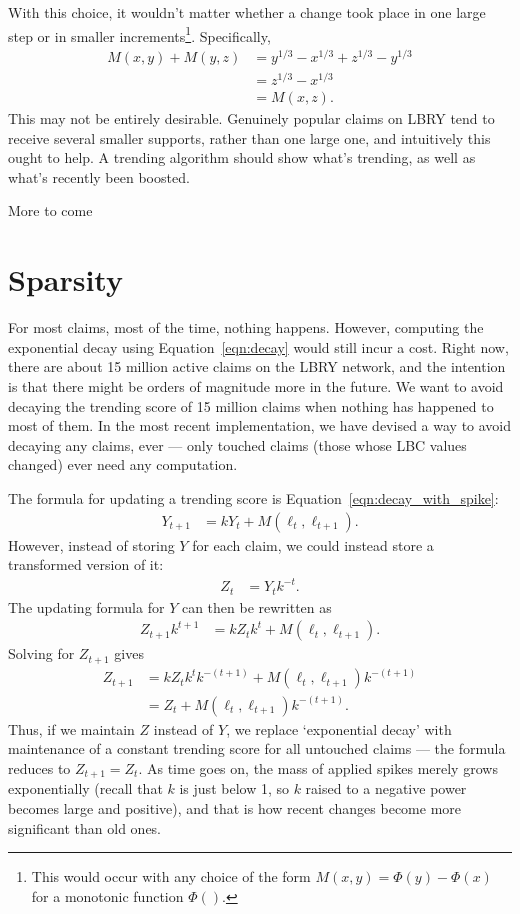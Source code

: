 \documentclass[a4paper, 12pt]{article}
\begin{document}
With this choice, it wouldn't matter whether a change took place in one large
step or in smaller increments\footnote{This would occur with any
choice of the form $M(x, y) = \Phi(y) - \Phi(x)$ for a monotonic function
$\Phi()$.}. Specifically,
\begin{align}
M(x, y) + M(y, z)
    &= y^{1/3} - x^{1/3} + z^{1/3} - y^{1/3} \\
    &= z^{1/3} - x^{1/3} \\
    &= M(x, z).
\end{align}
This may not be entirely desirable. Genuinely popular claims on LBRY tend
to receive several smaller supports, rather than one large one, and intuitively
this ought to help. A trending algorithm should show what's trending,
as well as what's recently been boosted.


More to come



\section{Sparsity}
For most claims, most of the time, nothing happens. However, computing the
exponential decay using Equation~\ref{eqn:decay} would still incur a cost.
Right now, there are about 15 million active claims on the LBRY network,
and the intention is that there might be orders of magnitude more in the
future. We want to avoid decaying the trending score of 15 million claims
when nothing has happened to most of them. In the most recent implementation,
we have devised a way to avoid decaying any claims, ever --- only touched claims
(those whose LBC values changed) ever need any computation.

The formula for updating a trending score is Equation~\ref{eqn:decay_with_spike}:
\begin{align}
Y_{t+1} &= kY_t + M(\ell_t, \ell_{t+1}).
\end{align}
However, instead of storing $Y$ for each claim, we could instead store
a transformed version of it:
\begin{align}
Z_t &= Y_t k^{-t}.
\end{align}
The updating formula for $Y$ can then be rewritten as
\begin{align}
Z_{t+1} k^{t+1} &= kZ_t k^t + M(\ell_t, \ell_{t+1}).
\end{align}
Solving for $Z_{t+1}$ gives
\begin{align}
Z_{t+1} &= kZ_t k^t k^{-(t+1)} + M(\ell_t, \ell_{t+1})k^{-(t+1)} \\
        &= Z_t + M(\ell_t, \ell_{t+1})k^{-(t+1)}.
\end{align}
Thus, if we maintain $Z$ instead of $Y$, 
we replace `exponential decay' with maintenance of a constant trending
score for all untouched claims --- the formula reduces to $Z_{t+1}=Z_t$.
As time goes on, the mass of applied spikes
merely grows exponentially (recall that $k$ is just below 1, so $k$
raised to a negative power becomes large and positive),
and that is how recent changes become more significant than old ones.
\end{document}
